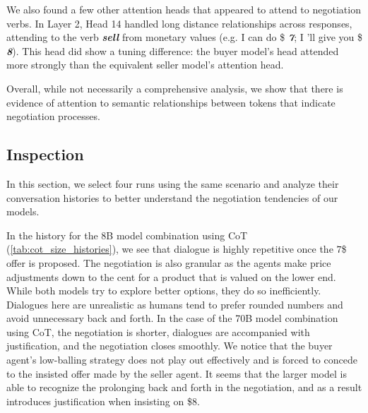 \documentclass[11pt]{article}
\begin{document}
We also found a few other attention heads that appeared to attend to negotiation verbs. In Layer 2, Head 14 handled long distance relationships across responses, attending to the verb \textit{\textbf{sell}} from monetary values (e.g. I can do \$ \textit{\textbf{7}}; I 'll give you \$ \textit{\textbf{8}}). This head did show a tuning difference: the buyer model's head attended more strongly than the equivalent seller model's attention head. 

Overall, while not necessarily a comprehensive analysis, we show that there is evidence of attention to semantic relationships between tokens that indicate negotiation processes. 


\subsection{Inspection}
In this section, we select four runs using the same scenario and analyze their conversation histories to better understand the negotiation tendencies of our models.

In the history for the 8B model combination using CoT (\ref{tab:cot_size_histories}), we see that dialogue is highly repetitive once the $7$\$ offer is proposed. The negotiation is also granular as the agents make price adjustments down to the cent for a product that is valued on the lower end. While both models try to explore better options, they do so inefficiently. Dialogues here are unrealistic as humans tend to prefer rounded numbers and avoid unnecessary back and forth. In the case of the 70B model combination using CoT, the negotiation is shorter, dialogues are accompanied with justification, and the negotiation closes smoothly. We notice that the buyer agent's low-balling strategy does not play out effectively and is forced to concede to the insisted offer made by the seller agent. It seems that the larger model is able to recognize the prolonging back and forth in the negotiation, and as a result introduces justification when insisting on \$8.  
\end{document}
